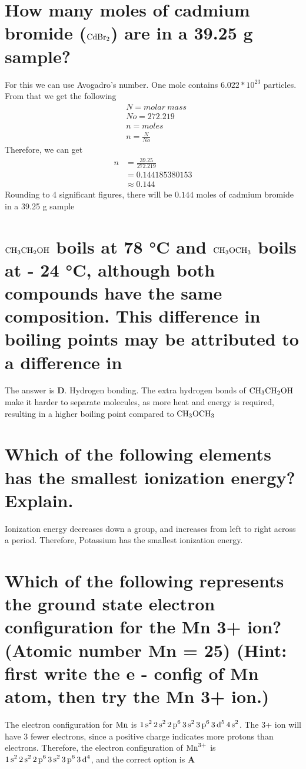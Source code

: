\documentclass[11pt]{article}
\begin{document}
\section{How many moles of cadmium bromide (\(\ce{CdBr2}\)) are in a 39.25 g sample?}
\label{sec:orgbd45dab}
For this we can use Avogadro's number. One mole contains \(6.022*10^{23}\) particles. From that we get the following
\begin{align*}
&N = molar\ mass\\
&No = 272.219\\
&n = moles\\
&n=\frac{N}{No}
\end{align*}
Therefore, we can get
\begin{align*}
n&= \frac{39.25}{272.219}\\
&=0.144185380153\\
&\approx0.144
\end{align*}
Rounding to 4 significant figures, there will be \(0.144\) moles of cadmium bromide in a 39.25 g sample

\section{\(\ce{CH3CH2OH}\) boils at 78 °C and \(\ce{CH3OCH3}\) boils at - 24 °C, although both compounds have the same composition. This difference in boiling points may be attributed to a difference in}
\label{sec:orgd14a538}
The answer is \textbf{D}. Hydrogen bonding. The extra hydrogen bonds of \(\ce{CH3CH2OH}\) make it harder to separate molecules, as more heat and energy is required, resulting in a higher boiling point compared to \(\ce{CH3OCH3}\)

\section{Which of the following elements has the smallest ionization energy? Explain.}
\label{sec:org35bb736}
Ionization energy decreases down a group, and increases from left to right across a period. Therefore, Potassium has the smallest ionization energy.

\section{Which of the following represents the ground state electron configuration for the Mn 3+ ion? (Atomic number Mn = 25) (Hint: first write the e - config of Mn atom, then try the Mn 3+ ion.)}
\label{sec:orgdc5259f}
The electron configuration for \(\ce{Mn}\) is \(\ce{1s^2 2s^2 2p^6 3s^2 3p^6 3d^5 4s^2}\). The 3+ ion will have 3 fewer electrons, since a positive charge indicates more protons than electrons. Therefore, the electron configuration of \(\ce{Mn^{3+}}\) is \(\ce{1s^2 2s^2 2p^6 3s^2 3p^6 3d^4}\), and the correct option is \textbf{A}
\end{document}

